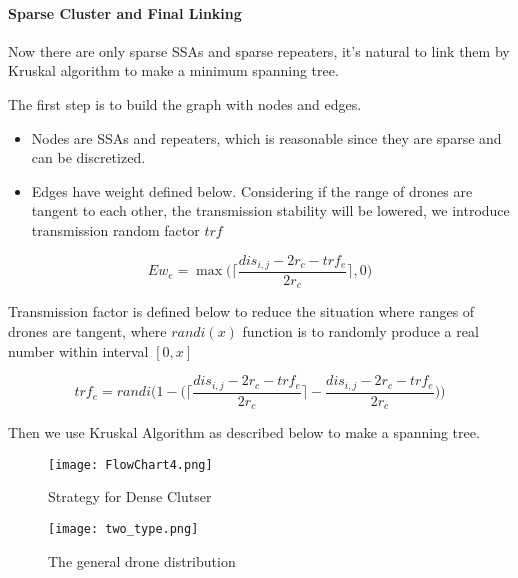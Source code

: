 \documentclass[../main]{subfiles}
\begin{document}
\paragraph{Sparse Cluster and Final Linking}

Now there are only sparse SSAs and sparse repeaters, it's natural to
link them by Kruskal algorithm to make a minimum spanning tree.

The first step is to build the graph with nodes and edges.

\begin{itemize}
\item
  Nodes are SSAs and repeaters, which is reasonable since they are
  sparse and can be discretized.
\item
  Edges have weight defined below. Considering if the range of drones
  are tangent to each other, the transmission stability will be lowered,
  we introduce transmission random factor \(trf\)
\end{itemize}

\begin{equation}
Ew_e= \max{ \Bigg(\Bigg\lceil \frac { dis_{i,j}  - 2r_c - trf_e} {2r_c} \Bigg\rceil,0\Bigg)}
\end{equation}

Transmission factor is defined below to reduce the situation where
ranges of drones are tangent, where \(randi(x)\) function is to randomly
produce a real number within interval \([0,x]\)

\begin{equation}
trf_e= randi \Bigg( 1- \Bigg(\Bigg\lceil \frac { dis_{i,j}  - 2r_c - trf_e} {2r_c} \Bigg\rceil -\frac { dis_{i,j}  - 2r_c - trf_e} {2r_c} \Bigg)\Bigg)
\end{equation}

Then we use Kruskal Algorithm\cite{kruskal} as described below to make a
spanning tree.

\newpage

\begin{figure}[h!]
      \centering
      \texttt{[image: FlowChart4.png]}
      \caption{Strategy for Dense Clutser}
    \end{figure}



\begin{figure}[h!]
      \centering
      \texttt{[image: two\_type.png]}
      \caption{The general drone distribution}
    \end{figure}
\end{document}
